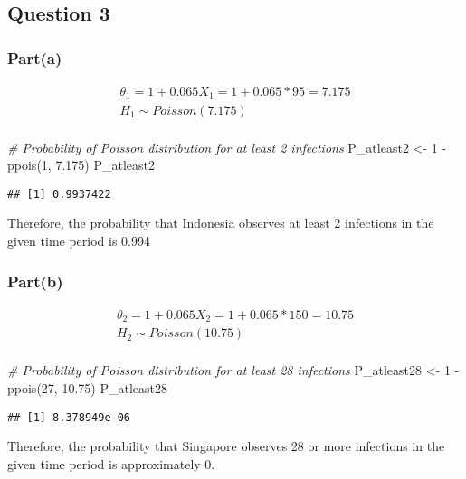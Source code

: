 \documentclass[
]{article}
\newenvironment{Shaded}{\begin{snugshade}}{\end{snugshade}}
\newcommand{\CommentTok}[1]{\textcolor[rgb]{0.56,0.35,0.01}{\textit{#1}}}
\newcommand{\DecValTok}[1]{\textcolor[rgb]{0.00,0.00,0.81}{#1}}
\newcommand{\FloatTok}[1]{\textcolor[rgb]{0.00,0.00,0.81}{#1}}
\newcommand{\FunctionTok}[1]{\textcolor[rgb]{0.00,0.00,0.00}{#1}}
\newcommand{\NormalTok}[1]{#1}
\newcommand{\OtherTok}[1]{\textcolor[rgb]{0.56,0.35,0.01}{#1}}
\newcommand{\SpecialCharTok}[1]{\textcolor[rgb]{0.00,0.00,0.00}{#1}}
\begin{document}
\hypertarget{question-3}{%
\subsection{Question 3}\label{question-3}}

\hypertarget{parta}{%
\subsubsection{Part(a)}\label{parta}}

\[\begin{aligned}
       \theta_1 = 1 + 0.065X_1 
          = 1 + 0.065 * 95 = 7.175 \\
       H_1 \sim Poisson(7.175) \\
\end{aligned}\]

\begin{Shaded}
\begin{Highlighting}[]
\CommentTok{\# Probability of Poisson distribution for at least 2 infections}
\NormalTok{P\_atleast2 }\OtherTok{\textless{}{-}} \DecValTok{1} \SpecialCharTok{{-}} \FunctionTok{ppois}\NormalTok{(}\DecValTok{1}\NormalTok{, }\FloatTok{7.175}\NormalTok{)}
\NormalTok{P\_atleast2}
\end{Highlighting}
\end{Shaded}

\begin{verbatim}
## [1] 0.9937422
\end{verbatim}

Therefore, the probability that Indonesia observes at least 2 infections
in the given time period is 0.994

\hypertarget{partb}{%
\subsubsection{Part(b)}\label{partb}}

\[\begin{aligned}
       \theta_2 = 1 + 0.065X_2 
          = 1 + 0.065 * 150 = 10.75 \\
       H_2 \sim Poisson(10.75) \\
\end{aligned}\]

\begin{Shaded}
\begin{Highlighting}[]
\CommentTok{\# Probability of Poisson distribution for at least 28 infections}
\NormalTok{P\_atleast28 }\OtherTok{\textless{}{-}} \DecValTok{1} \SpecialCharTok{{-}} \FunctionTok{ppois}\NormalTok{(}\DecValTok{27}\NormalTok{, }\FloatTok{10.75}\NormalTok{)}
\NormalTok{P\_atleast28}
\end{Highlighting}
\end{Shaded}

\begin{verbatim}
## [1] 8.378949e-06
\end{verbatim}

Therefore, the probability that Singapore observes 28 or more infections
in the given time period is approximately 0.
\end{document}
